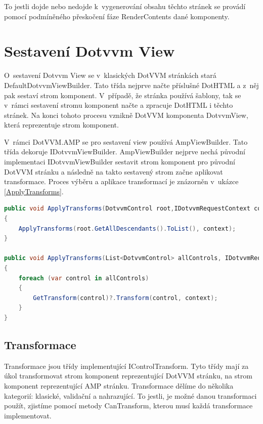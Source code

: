 To jestli dojde nebo nedojde k~vygenerování obsahu těchto stránek se provádí pomocí podmíněného přeskočení fáze RenderContents dané komponenty.
 
\section{Sestavení Dotvvm View}
O~sestavení Dotvvm View se v~klasických DotVVM stránkách stará DefaultDotvvmViewBuilder. Tato třída nejprve načte příslušné DotHTML a z~něj pak sestaví strom komponent. V~případě, že stránka používá šablony, tak se v~rámci sestavení stromu komponent načte a zpracuje DotHTML i těchto stránek. Na konci tohoto procesu vznikně DotVVM komponenta  DotvvmView, která reprezentuje strom komponent.

V~rámci DotVVM.AMP se pro sestavení view používá AmpViewBuilder. Tato třída dekoruje IDotvvmViewBuilder. AmpViewBuilder nejprve nechá původní implementaci IDotvvmViewBuilder sestavit strom komponent pro původní DotVVM stránku a následně na takto sestavený strom začne aplikovat transformace. Proces výběru a aplikace transformací je znázorněn v~ukázce \ref{ApplyTransforms}. 
\begin{lstlisting}[language=c#, caption= Ukázka aplikace transformací ,label=ApplyTransforms,captionpos=t]
public void ApplyTransforms(DotvvmControl root,IDotvvmRequestContext context)
{
    ApplyTransforms(root.GetAllDescendants().ToList(), context);
}

public void ApplyTransforms(List<DotvvmControl> allControls, IDotvvmRequestContext context)
{
    foreach (var control in allControls)
    {
        GetTransform(control)?.Transform(control, context);
    }
}
\end{lstlisting}
\subsection*{Transformace}
Transformace jsou třídy implementující IControlTransform. Tyto třídy mají za úkol transformovat strom komponent reprezentující DotVVM stránku, na strom komponent reprezentující AMP stránku. Transformace dělíme do několika kategorií: klasické, validační a nahrazující. To jestli, je možné danou transformaci použít, zjistíme pomocí metody CanTransform, kterou musí každá transformace implementovat.
